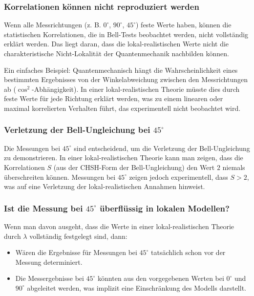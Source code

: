 \documentclass[12pt,a4paper]{article}
\begin{document}
	\subsubsection{Korrelationen können nicht reproduziert werden}
	Wenn alle Messrichtungen (z. B. $0^\circ$, $90^\circ$, $45^\circ$) feste Werte haben, können die statistischen Korrelationen, die in Bell-Tests beobachtet werden, nicht vollständig erklärt werden. Das liegt daran, dass die lokal-realistischen Werte nicht die charakteristische Nicht-Lokalität der Quantenmechanik nachbilden können.
	
	Ein einfaches Beispiel:
	Quantenmechanisch hängt die Wahrscheinlichkeit eines bestimmten Ergebnisses von der Winkelabweichung zwischen den Messrichtungen ab ($\cos^2$-Abhängigkeit). In einer lokal-realistischen Theorie müsste dies durch feste Werte für jede Richtung erklärt werden, was zu einem linearen oder maximal korrelierten Verhalten führt, das experimentell nicht beobachtet wird.
	
	\subsubsection{Verletzung der Bell-Ungleichung bei $45^\circ$}
	Die Messungen bei $45^\circ$ sind entscheidend, um die Verletzung der Bell-Ungleichung zu demonstrieren. In einer lokal-realistischen Theorie kann man zeigen, dass die Korrelationen $S$ (aus der CHSH-Form der Bell-Ungleichung) den Wert $2$ niemals überschreiten können. Messungen bei $45^\circ$ zeigen jedoch experimentell, dass $S > 2$, was auf eine Verletzung der lokal-realistischen Annahmen hinweist.
	
	
	
	\subsubsection{Ist die Messung bei $45^\circ$ überflüssig in lokalen Modellen?}
	
	Wenn man davon ausgeht, dass die Werte in einer lokal-realistischen Theorie durch $\lambda$ vollständig festgelegt sind, dann:
	\begin{itemize}
		\item Wären die Ergebnisse für Messungen bei $45^\circ$ tatsächlich schon vor der Messung determiniert.
		\item Die Messergebnisse bei $45^\circ$ könnten aus den vorgegebenen Werten bei $0^\circ$ und $90^\circ$ abgeleitet werden, was implizit eine Einschränkung des Modells darstellt.
	\end{itemize}
	
\end{document}
